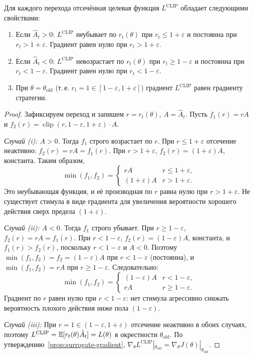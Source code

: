 \begin{theorem}
\label{thm:ppo-clip-cases}
Для каждого перехода отсечённая целевая функция $L^{\mathrm{CLIP}}$ обладает следующими свойствами:
\begin{enumerate}[label=(\roman*), leftmargin=*]
  \item Если $\hat{A}_t > 0$: $L^{\mathrm{CLIP}}$ неубывает по $r_t(\theta)$ при $r_t \leq 1+\varepsilon$ и постоянна при $r_t > 1+\varepsilon$. Градиент равен нулю при $r_t > 1+\varepsilon$.
  \item Если $\hat{A}_t < 0$: $L^{\mathrm{CLIP}}$ невозрастает по $r_t(\theta)$ при $r_t \geq 1-\varepsilon$ и постоянна при $r_t < 1-\varepsilon$. Градиент равен нулю при $r_t < 1-\varepsilon$.
  \item При $\theta = \theta_\mathrm{old}$ (т.\,е. $r_t = 1 \in [1-\varepsilon, 1+\varepsilon]$) градиент $L^{\mathrm{CLIP}}$ равен градиенту стратегии.
\end{enumerate}
\end{theorem}

\begin{proof}
Зафиксируем переход и запишем $r = r_t(\theta)$, $A = \hat{A}_t$. Пусть $f_1(r) = r A$ и $f_2(r) = \operatorname{clip}(r, 1-\varepsilon, 1+\varepsilon)\cdot A$.

\medskip
\textit{Случай (i): $A > 0$.}
Тогда $f_1$ строго возрастает по $r$. При $r \leq 1+\varepsilon$ отсечение неактивно: $f_2(r) = rA = f_1(r)$. При $r > 1+\varepsilon$, $f_2(r) = (1+\varepsilon)A$, константа. Таким образом,
\[
\min(f_1, f_2)
= \begin{cases} rA & r \leq 1+\varepsilon, \\ (1+\varepsilon)A & r > 1+\varepsilon.\end{cases}
\]
Это неубывающая функция, и её производная по $r$ равна нулю при $r > 1+\varepsilon$. Не существует стимула в виде градиента для увеличения вероятности хорошего действия сверх предела $(1+\varepsilon)$.

\medskip
\textit{Случай (ii): $A < 0$.}
Тогда $f_1$ строго убывает. При $r \geq 1-\varepsilon$, $f_2(r) = rA = f_1(r)$. При $r < 1-\varepsilon$, $f_2(r) = (1-\varepsilon)A$, константа, и $f_1(r) > f_2(r)$, поскольку $r < 1-\varepsilon$ и $A<0$.
Поэтому $\min(f_1,f_2) = f_2 = (1-\varepsilon)A$ при $r < 1-\varepsilon$ (постоянна), и $\min(f_1,f_2) = rA$ при $r \geq 1-\varepsilon$. Следовательно:
\[
\min(f_1, f_2)
= \begin{cases} (1-\varepsilon)A & r < 1-\varepsilon, \\ rA & r \geq 1-\varepsilon.\end{cases}
\]
Градиент по $r$ равен нулю при $r < 1-\varepsilon$: нет стимула агрессивно снижать вероятность плохого действия ниже пола $(1-\varepsilon)$.

\medskip
\textit{Случай (iii):} При $r = 1 \in (1-\varepsilon, 1+\varepsilon)$ отсечение неактивно в обоих случаях, поэтому $L^{\mathrm{CLIP}} = \operatorname{\mathbb{E}}[r_t(\theta)\hat{A}_t] = L(\theta)$ в окрестности $\theta_\mathrm{old}$. По утверждению~\ref{prop:surrogate-gradient}, $\nabla_\theta L^{\mathrm{CLIP}} |_{\theta_\mathrm{old}} = \nabla_\theta J(\theta)|_{\theta_\mathrm{old}}$.
\end{proof}


